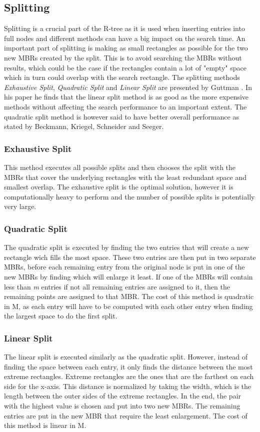 \subsection{Splitting}
Splitting is a crucial part of the R-tree as it is used when inserting entries into full nodes and different methods can have a big impact on the search time. An important part of splitting is making as small rectangles as possible for the two new MBRs created by the split. This is to avoid searching the MBRs without results, which could be the case if the rectangles contain a lot of "empty" space which in turn could overlap with the search rectangle. The splitting methods \emph{Exhaustive Split}, \emph{Quadratic Split} and \emph{Linear Split} are presented by Guttman \cite{r-tree}. In his paper he finds that the linear split method is as good as the more expensive methods without affecting the search performance to an important extent. The quadratic split method is however said to have better overall performance as stated by Beckmann, Kriegel, Schneider and Seeger\cite{R*-tree}.

\subsubsection{Exhaustive Split}
This method executes all possible splits and then chooses the split with the MBRs that cover the underlying rectangles with the least redundant space and smallest overlap. The exhaustive split is the optimal solution, however it is computationally heavy to perform and the number of possible splits is potentially very large.

\subsubsection{Quadratic Split}
The quadratic split is executed by finding the two entries that will create a new rectangle wich fills the most space. These two entries are then put in two separate MBRs, before each remaining entry from the original node is put in one of the new MBRs by finding which will enlarge it least. If one of the MBRs will contain less than \emph{m} entries if not all remaining entries are assigned to it, then the remaining points are assigned to that MBR. The cost of this method is quadratic in M, as each entry will have to be computed with each other entry when finding the largest space to do the first split. 

\subsubsection{Linear Split}
The linear split is executed similarly as the quadratic split. However, instead of finding the space between each entry, it only finds the distance between the most extreme rectangles. Extreme rectangles are the ones that are the farthest on each side for the x-axis. This distance is normalized by taking the width, which is the length between the outer sides of the extreme rectangles. In the end, the pair with the highest value is chosen and put into two new MBRs. The remaining entries are put in the new MBR that require the least enlargement. The cost of this method is linear in M. 

